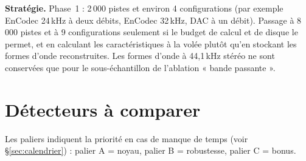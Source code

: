 \documentclass[11pt,a4paper]{article}
\begin{document}
\textbf{Stratégie.} Phase~1 : 2\,000 pistes et environ 4 configurations (par exemple EnCodec 24\,kHz à deux débits, EnCodec 32\,kHz, DAC à un débit). Passage à 8\,000 pistes et à 9 configurations seulement si le budget de calcul et de disque le permet, et en calculant les caractéristiques à la volée plutôt qu'en stockant les formes d'onde reconstruites. Les formes d'onde à 44,1\,kHz stéréo ne sont conservées que pour le sous-échantillon de l'ablation « bande passante ».

\section{Détecteurs à comparer}
\label{sec:detecteurs}

Les paliers indiquent la priorité en cas de manque de temps (voir \S\ref{sec:calendrier}) : palier A = noyau, palier B = robustesse, palier C = bonus.
\end{document}
